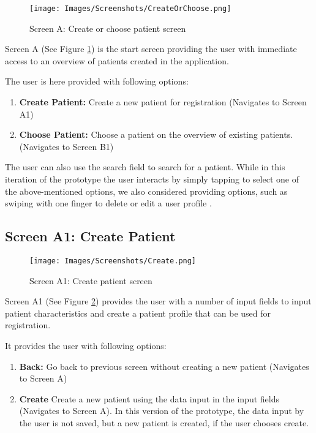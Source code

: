\begin{figure}[H] \centering
			\texttt{[image: Images/Screenshots/CreateOrChoose.png]}
		\caption{Screen A: Create or choose patient screen} \label{fig:screenA}
\end{figure}

Screen A (See Figure \ref{fig:screenA}) is the start screen providing the user with immediate access to an overview of patients created in the application. 

The user is here provided with following options:
\begin{enumerate}
\item \textbf{Create Patient:} Create a new patient for registration (Navigates to Screen A1)
\item \textbf{Choose Patient:} Choose a patient on the overview of existing patients. (Navigates to Screen B1)
\end{enumerate}


The user can also use the search field to search for a patient. While in this iteration of the prototype the user interacts by simply tapping to select one of the above-mentioned options, we also considered providing options, such as swiping with one finger to delete or edit a user profile . \newpage

\subsection*{Screen A1: Create Patient}

\begin{figure}[H] \centering
			\texttt{[image: Images/Screenshots/Create.png]}
		\caption{Screen A1: Create patient screen} \label{fig:screenA1}
\end{figure}

Screen A1  (See Figure \ref{fig:screenA1}) provides the user with a number of input fields to input patient characteristics and create a patient profile that can be used for registration. 

It provides the user with following options: 
\begin{enumerate}
\item \textbf{Back:} Go back to previous screen without creating a new patient (Navigates to Screen A)
\item \textbf{Create} Create a new patient using the data input in the input fields (Navigates to Screen A). In this version of the prototype, the data input by the user is not saved, but a new patient is created, if the user chooses create. 
\end{enumerate}\newpage



